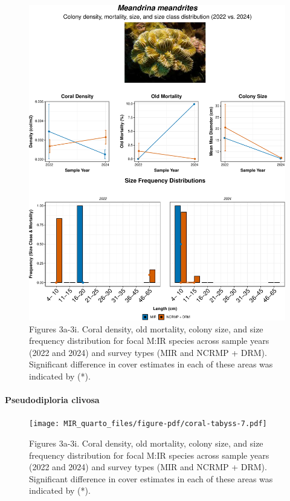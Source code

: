\documentclass[
]{article}
\let\oldparagraph\paragraph
\renewcommand{\paragraph}[1]{\oldparagraph{#1}\mbox{}}
\begin{document}
\begin{figure}

{\centering \includegraphics{MIR_quarto_files/figure-pdf/coral-tabyss-6.pdf}

}

\caption{Figures 3a-3i. Coral density, old mortality, colony size, and
size frequency distribution for focal M:IR species across sample years
(2022 and 2024) and survey types (MIR and NCRMP + DRM). Significant
difference in cover estimates in each of these areas was indicated by
(*).}

\end{figure}

\hypertarget{pseudodiploria-clivosa}{%
\paragraph{\texorpdfstring{ Pseudodiploria clivosa
}{ Pseudodiploria clivosa }}\label{pseudodiploria-clivosa}}

\begin{figure}

{\centering \texttt{[image: MIR\_quarto\_files/figure-pdf/coral-tabyss-7.pdf]}

}

\caption{Figures 3a-3i. Coral density, old mortality, colony size, and
size frequency distribution for focal M:IR species across sample years
(2022 and 2024) and survey types (MIR and NCRMP + DRM). Significant
difference in cover estimates in each of these areas was indicated by
(*).}

\end{figure}
\end{document}
